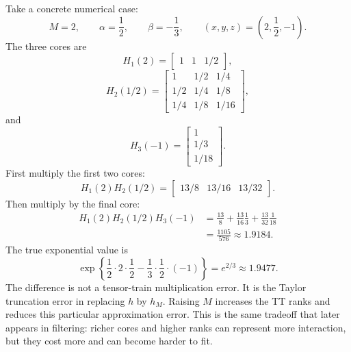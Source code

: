 \documentclass[11pt]{article}
\numberwithin{equation}{section}
\begin{document}
Take a concrete numerical case:
\[
    M=2,\qquad \alpha=\frac12,\qquad \beta=-\frac13,\qquad
    (x,y,z)=\left(2,\frac12,-1\right).
\]
The three cores are
\begin{equation}
    H_1(2)
    =
    \begin{bmatrix}
    1 & 1 & 1/2
    \end{bmatrix},
    \label{eq:p30-tt-example-8}
\end{equation}
\begin{equation}
    H_2(1/2)
    =
    \begin{bmatrix}
    1 & 1/2 & 1/4\\
    1/2 & 1/4 & 1/8\\
    1/4 & 1/8 & 1/16
    \end{bmatrix},
    \label{eq:p30-tt-example-9}
\end{equation}
and
\begin{equation}
    H_3(-1)
    =
    \begin{bmatrix}
    1\\[2pt]
    1/3\\[2pt]
    1/18
    \end{bmatrix}.
    \label{eq:p30-tt-example-10}
\end{equation}
First multiply the first two cores:
\begin{equation}
    H_1(2)H_2(1/2)
    =
    \begin{bmatrix}
    13/8 & 13/16 & 13/32
    \end{bmatrix}.
    \label{eq:p30-tt-example-11}
\end{equation}
Then multiply by the final core:
\begin{equation}
\begin{aligned}
    H_1(2)H_2(1/2)H_3(-1)
    &=
    \frac{13}{8}
    +\frac{13}{16}\frac13
    +\frac{13}{32}\frac1{18}  \\
    &=
    \frac{1105}{576}
    \approx 1.9184.
\end{aligned}
    \label{eq:p30-tt-example-12}
\end{equation}
The true exponential value is
\begin{equation}
    \exp\left\{
      \frac12\cdot2\cdot\frac12
      -\frac13\cdot\frac12\cdot(-1)
    \right\}
    =
    e^{2/3}
    \approx 1.9477.
    \label{eq:p30-tt-example-13}
\end{equation}
The difference is not a tensor-train multiplication error.  It is the Taylor
truncation error in replacing \(h\) by \(h_M\).  Raising \(M\) increases the TT
ranks and reduces this particular approximation error.  This is the same
tradeoff that later appears in filtering: richer cores and higher ranks can
represent more interaction, but they cost more and can become harder to fit.
\end{document}
